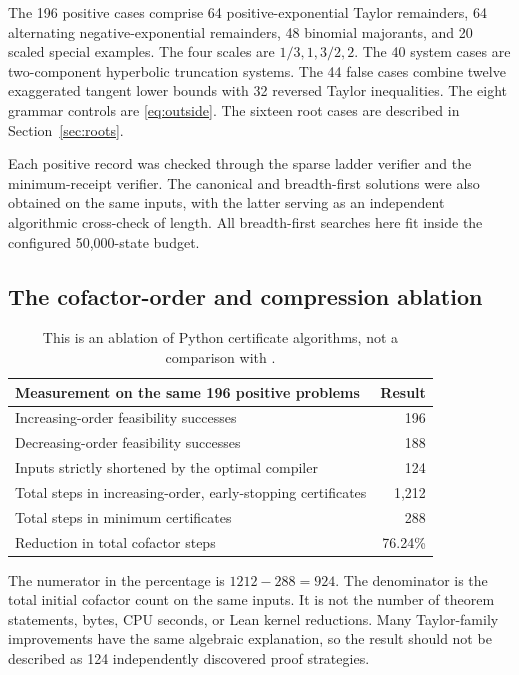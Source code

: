 The 196 positive cases comprise 64 positive-exponential Taylor remainders, 64 alternating negative-exponential remainders, 48 binomial majorants, and 20 scaled special examples. The four scales are $1/3,1,3/2,2$. The 40 system cases are two-component hyperbolic truncation systems. The 44 false cases combine twelve exaggerated tangent lower bounds with 32 reversed Taylor inequalities. The eight grammar controls are \eqref{eq:outside}. The sixteen root cases are described in Section~\ref{sec:roots}.

Each positive record was checked through the sparse ladder verifier and the minimum-receipt verifier. The canonical and breadth-first solutions were also obtained on the same inputs, with the latter serving as an independent algorithmic cross-check of length. All breadth-first searches here fit inside the configured 50,000-state budget.

\subsection{The cofactor-order and compression ablation}

\begin{table}[ht]
\centering
\begin{tabularx}{\textwidth}{@{}Xr@{}}
\toprule
Measurement on the same 196 positive problems & Result\\
\midrule
Increasing-order feasibility successes & 196\\
Decreasing-order feasibility successes & 188\\
Inputs strictly shortened by the optimal compiler & 124\\
Total steps in increasing-order, early-stopping certificates & 1,212\\
Total steps in minimum certificates & 288\\
Reduction in total cofactor steps & 76.24\%\\
\bottomrule
\end{tabularx}
\caption{This is an ablation of Python certificate algorithms, not a comparison with .}
\label{tab:ablation}
\end{table}

The numerator in the percentage is $1212-288=924$. The denominator is the total initial cofactor count on the same inputs. It is not the number of theorem statements, bytes, CPU seconds, or Lean kernel reductions. Many Taylor-family improvements have the same algebraic explanation, so the result should not be described as 124 independently discovered proof strategies.

